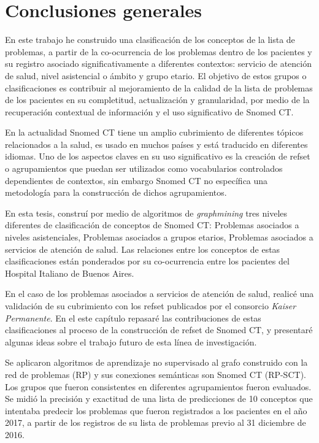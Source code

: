 \section{Conclusiones generales}
En este trabajo he construido una clasificación de los conceptos de la lista de problemas, a partir de la co-ocurrencia de los problemas dentro de los pacientes y su registro asociado significativamente a diferentes contextos: servicio de atención de salud, nivel asistencial o ámbito y grupo etario. El objetivo de estos grupos o clasificaciones es contribuir al mejoramiento de la calidad de la lista de problemas de los pacientes en su completitud, actualización y granularidad, por medio de la recuperación contextual de información y el uso significativo de Snomed CT.

En la actualidad Snomed CT tiene un amplio cubrimiento de diferentes tópicos relacionados a la salud, es usado en muchos países y está traducido en diferentes idiomas. Uno de los aspectos claves en su uso significativo es la creación de \acrshort{refset} o agrupamientos que puedan ser utilizados como vocabularios controlados dependientes de contextos, sin embargo Snomed CT no específica una metodología para la construcción de dichos agrupamientos.

En esta tesis, construí por medio de algoritmos de \textit{graphmining} tres niveles diferentes de clasificación de conceptos de Snomed CT: Problemas asociados a niveles asistenciales, Problemas asociados a grupos etarios, Problemas asociados a servicios de atención de salud. Las relaciones entre los conceptos de estas clasificaciones están ponderados por su co-ocurrencia entre los pacientes del Hospital Italiano de Buenos Aires.

En el caso de los problemas asociados a servicios de atención de salud, realicé una validación de su cubrimiento con los \acrshort{refset} publicados por el consorcio \textit{Kaiser Permanente}. En el este capítulo repasaré las contribuciones de estas clasificaciones al proceso de la construcción de \acrshort{refset} de Snomed CT, y presentaré algunas ideas sobre el trabajo futuro de esta línea de investigación.

Se aplicaron algoritmos de aprendizaje no supervisado al grafo construido con la red de problemas (\acrshort{RP})  y sus conexiones semánticas son Snomed CT (\acrshort{RP-SCT}). Los grupos que fueron consistentes en diferentes agrupamientos fueron evaluados. Se midió  la precisión y exactitud de una lista de predicciones de 10 conceptos que intentaba predecir los problemas que fueron registrados a los pacientes en el año 2017, a partir de los registros de su lista de problemas previo al 31 diciembre de 2016. 

